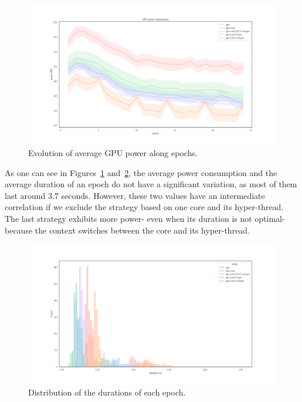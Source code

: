 \begin{figure}
    \centering
    \includegraphics[width=1.1\textwidth]{imgs/power_gpu_baedonepoche.pdf}
    \caption{Evolution of average GPU power along epochs.}
    \label{fig:ephoch_power}
\end{figure}

As one can see in Figures~\ref{fig:ephoch_power} and~\ref{fig:epoch_duration}, the average power consumption and the average duration of an epoch do not have a significant variation, as most of them last around 3.7 seconds.
However, these two values have an intermediate correlation if we exclude the strategy based on one core and its hyper-thread.
The last strategy exhibits more power- even when its duration is not optimal- because the context switches between the core and its hyper-thread.

\begin{figure}
    \centering
    \includegraphics[width=1.1\textwidth]{imgs/epoch_duration.pdf}
    \caption{Distribution of the durations of each epoch.}
    \label{fig:epoch_duration}
\end{figure}

